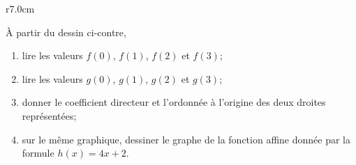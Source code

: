 
\begin{exercice}\label{exosmath-0511}

\begin{wrapfigure}{r}{7.0cm}
   \vspace{-3cm}        %
   \centering
   
\end{wrapfigure}

À partir du dessin ci-contre,
\begin{enumerate}
    \item
        lire les valeurs \( f(0)\), \( f(1)\), \( f(2)\) et \( f(3)\);
    \item
        lire les valeurs \( g(0)\), \( g(1)\), \( g(2)\) et \( g(3)\);
    \item
        donner le coefficient directeur et l'ordonnée à l'origine des deux droites représentées;
    \item
       sur le même graphique, dessiner le graphe de la fonction affine donnée par la formule \( h(x)=4x+2\).
\end{enumerate}

\end{exercice}

\vspace{2.5cm}  %

